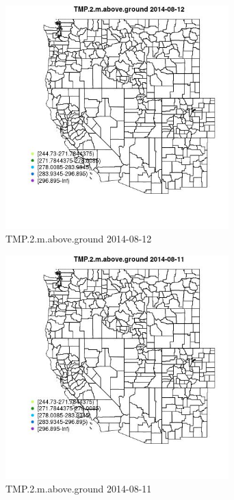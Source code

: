 \begin{figure} 
\centering  
\includegraphics[width=0.77\textwidth]{Code_Outputs/Report_ML_input_PM25_Step4_part_e_de_duplicated_aveswNAs_MapObsTMP2maboveground2014-08-12.jpg} 
\caption{\label{fig:Report_ML_input_PM25_Step4_part_e_de_duplicated_aveswNAsMapObsTMP2maboveground2014-08-12}TMP.2.m.above.ground 2014-08-12} 
\end{figure} 
 

\begin{figure} 
\centering  
\includegraphics[width=0.77\textwidth]{Code_Outputs/Report_ML_input_PM25_Step4_part_e_de_duplicated_aveswNAs_MapObsTMP2maboveground2014-08-11.jpg} 
\caption{\label{fig:Report_ML_input_PM25_Step4_part_e_de_duplicated_aveswNAsMapObsTMP2maboveground2014-08-11}TMP.2.m.above.ground 2014-08-11} 
\end{figure} 
 

